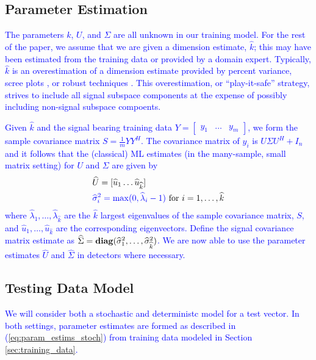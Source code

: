 \subsection{Parameter Estimation}\label{sec:param_estim}

\textcolor{blue}{The parameters $k$, $U$, and $\Sigma$ are all unknown in our training model. For the rest of the paper, we assume that we are given a dimension estimate, $\widehat{k}$; this may have been estimated from the training data or provided by a domain expert. Typically, $\widehat{k}$ is an overestimation of a dimension estimate provided by percent variance, scree plots \cite{zhu2006automatic}, or robust techniques \cite{nadakuditi2010fundamental,johnstone2001distribution,el2007tracy}. This overestimation, or ``play-it-safe'' strategy, strives to include all signal subspace components at the expense of possibly including non-signal subspace compoents.}

\textcolor{blue}{Given $\widehat{k}$ and the signal bearing training data $Y = \begin{bmatrix} y_1 & \dots & y_m \end{bmatrix}$, we form the sample covariance matrix $S=\frac{1}{m}YY^{H}$. The covariance matrix of $y_i$ is $U\Sigma U^H +I_n$ and it follows that the (classical) ML estimates (in the many-sample, small matrix setting) for $U$ and $\Sigma$ are given by \cite{muirhead1982aspects}
\begin{equation}\label{eq:param_estims_stoch}
\begin{aligned}
&\widehat{U}=[\widehat{u}_1 \dots \widehat{u}_{\widehat{k}}]\\
&\textcolor{blue}{\widehat{\sigma}_i^2 = \max(0,\widehat{\lambda}_i -1)} \text{ for } i=1,\dots,\widehat{k}\\
\end{aligned}
\end{equation}
where $\widehat{\lambda}_1,\dots,\widehat{\lambda}_{\widehat{k}}$ are the $\widehat{k}$  largest eigenvalues of the sample covariance matrix, $S$, and $\widehat{u}_1,\dots,\widehat{u}_{\widehat{k}}$ are the corresponding eigenvectors. Define the signal covariance matrix estimate as $\widehat{\Sigma}=\mathop{\bf diag}(\widehat{\sigma}_1^2,\dots,\widehat{\sigma}_{\widehat{k}}^2)$. We are now able to use the parameter estimates $\widehat{U}$ and $\widehat{\Sigma}$ in detectors where necessary.}

\subsection{Testing Data Model}
\textcolor{blue}{We will consider both a stochastic and deterministc model for a test vector. In both settings, parameter estimates are formed as described in (\ref{eq:param_estims_stoch}) from training data modeled in Section \ref{sec:training_data}.}

